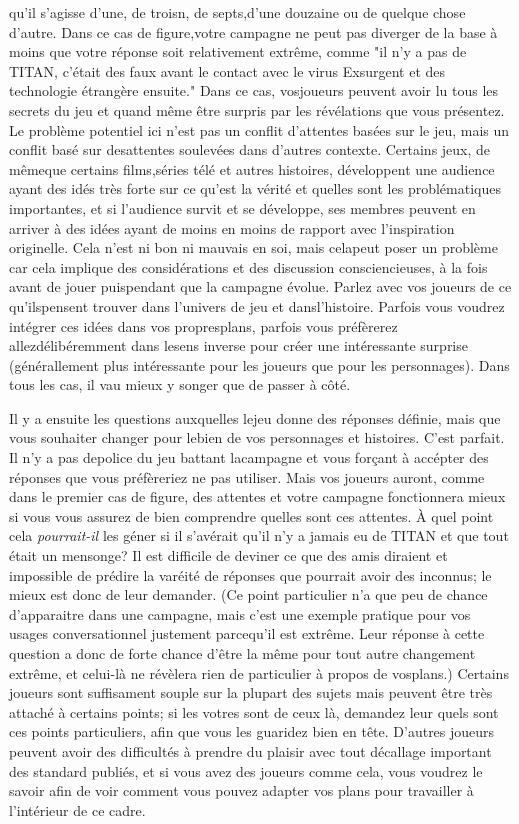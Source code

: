 qu'il s'agisse d'une, de troisn, de septs,d'une douzaine ou de quelque chose d'autre. Dans ce cas de figure,votre campagne ne peut pas diverger de la base à moins que votre réponse soit relativement extrême, comme "il n'y a pas de TITAN, c'était des faux avant le contact avec le virus Exsurgent et des technologie étrangère ensuite." Dans ce cas, vosjoueurs peuvent avoir lu tous les secrets du jeu et quand même être surpris par les révélations que vous présentez. Le problème potentiel ici n'est pas un conflit d'attentes basées sur le jeu, mais un conflit basé sur desattentes soulevées dans d'autres contexte. Certains jeux, de mêmeque certains films,séries télé et autres histoires, développent une audience ayant des idés très forte sur ce qu'est la vérité et quelles sont les problématiques importantes, et si l'audience survit et se développe, ses membres peuvent en arriver à des idées ayant de moins en moins de rapport avec l'inspiration originelle. Cela n'est ni bon ni mauvais en soi, mais celapeut poser un problème car cela implique des considérations et des discussion consciencieuses, à la fois avant de jouer puispendant que la campagne évolue. Parlez avec vos joueurs de ce qu'ilspensent trouver dans l'univers de jeu et dansl'histoire. Parfois vous voudrez intégrer ces idées dans vos propresplans, parfois vous préfèrerez allezdélibéremment dans lesens inverse pour créer une intéressante surprise (générallement plus intéressante pour les joueurs que pour les personnages). Dans tous les cas, il vau mieux y songer que de passer à côté. 

Il y a ensuite les questions auxquelles lejeu donne des réponses définie, mais que vous souhaiter changer pour lebien de vos personnages et histoires. C'est parfait. Il n'y a pas depolice du jeu battant lacampagne et vous forçant à accépter des réponses que vous préfèreriez ne pas utiliser. Mais vos joueurs auront, comme dans le premier cas de figure, des attentes et votre campagne fonctionnera mieux si vous vous assurez de bien comprendre quelles sont ces attentes. À quel point cela \textit{pourrait-il} les géner si il s'avérait qu'il n'y a jamais eu de TITAN et que tout était un mensonge? Il est difficile de deviner ce que des amis diraient et impossible de prédire la varéité de réponses que pourrait avoir  des inconnus; le mieux est donc de leur demander. (Ce point particulier n'a que peu de chance d'apparaitre dans une campagne, mais c'est une exemple pratique pour vos usages conversationnel justement parcequ'il est extrême. Leur réponse à cette question a donc de forte chance d'être la même pour tout autre changement extrême, et celui-là ne révèlera rien de particulier à propos de vosplans.) Certains joueurs sont suffisament souple sur la plupart des sujets mais peuvent être très attaché à certains points; si les votres sont de ceux là, demandez leur quels sont ces points particuliers, afin que vous les guaridez bien en tête. D'autres joueurs peuvent avoir des difficultés à prendre du plaisir avec tout décallage important des standard publiés, et si vous avez des joueurs comme cela, vous voudrez le savoir afin de voir comment vous pouvez adapter vos plans pour travailler à l'intérieur de ce cadre. 

